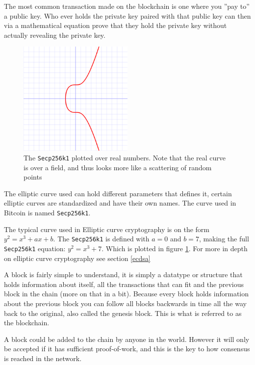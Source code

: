 The most common transaction made on the blockchain is one where you ''pay to''
a public key. Who ever holds the private key paired with that public key can
then via a mathematical equation prove that they hold the private key without
actually revealing the private key.\cite{quantabytes}

\begin{figure}[H]
	\centering
	\includegraphics[width=0.5\textwidth]{introduction/images/Secp256k1.png}
	\caption{The \texttt{Secp256k1} plotted over real numbers. Note that the real
	curve is over a field, and thus looks more like a scattering of random points}
	\label{fig:eccbasic}
\end{figure}

The elliptic curve used can hold different parameters that defines it, certain
elliptic curves are standardized and have their own names. The curve used in
Bitcoin is named \texttt{Secp256k1}.\cite{Secp256k1_def}\cite{antonopoulos_2017}

The typical curve used in Elliptic curve cryptography is on the form
$y^2=x^3+ax+b$. The \texttt{Secp256k1} is defined with $a=0$ and $b=7$, making
the full \texttt{Secp256k1} equation: $y^2=x^3+7$. Which is plotted in figure
\ref*{fig:eccbasic}. For more in depth on elliptic curve cryptography see
section \ref{ecdsa}

A block is fairly simple to understand, it is simply a datatype or structure
that holds information about itself, all the transactions that can fit and the
previous block in the chain (more on that in a bit). Because every block holds
information about the previous block you can follow all blocks backwards in time
all the way back to the original, also called the genesis block.\cite{genesis}
This is what is referred to as the blockchain.

A block could be added to the chain by anyone in the world. However it will only
be accepted if it has sufficient proof-of-work, and this is the key to how
consensus is reached in the network.\cite{antonopoulos_2017}

